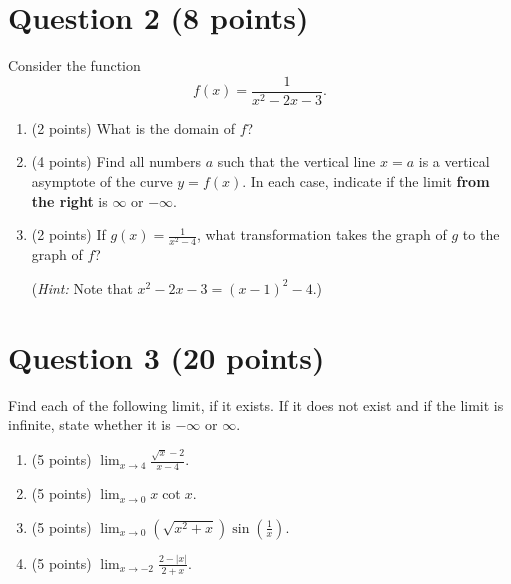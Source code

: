 \documentclass{article}
\begin{document}
\pagebreak

\section*{Question 2 (8 points)}
Consider the function
$$f(x)=\frac{1}{x^2-2x-3}.$$


\begin{enumerate}[label=(\alph*)]
    \item  (2 points) What is the domain of $f$?
    \vspace{1in}

    \item (4 points) Find all numbers $a$ such that the vertical line $x=a$ is a vertical asymptote of the curve $y=f(x)$. In each case, indicate if the limit \textbf{from the right} is $\infty$ or $-\infty$.
    \vspace{3in}
    \item (2 points) If $g(x)=\frac{1}{x^2-4}$, what transformation takes the graph of $g$ to the graph of $f$? 

    (\textit{Hint:} Note that $x^2-2x-3= (x-1)^2-4$.)

\end{enumerate}

\pagebreak

\section*{Question 3 (20 points)}
Find each of the following limit, if it exists. If it does not exist and if the limit is infinite, state whether it is $-\infty$ or $\infty$.

    \begin{enumerate}[label=(\alph*)]
        \item (5 points) $\displaystyle \lim_{x \to 4} \frac{\sqrt{x}-2}{x-4}$.
        \vspace{1.5in}
        \item (5 points) $\displaystyle \lim_{x \to 0} x \operatorname{cot} x$.
        \vspace{1.5in}
        \item (5 points) $\displaystyle \lim_{x \to 0} (\sqrt{x^2+x})\sin{\left(\frac{1}{x}\right)}$.
        \vspace{2in}
        \item (5 points) $\displaystyle \lim_{x \to -2} \frac{2-|x|}{2+x}$.
        \vspace{2in}
    \end{enumerate}
\end{document}
